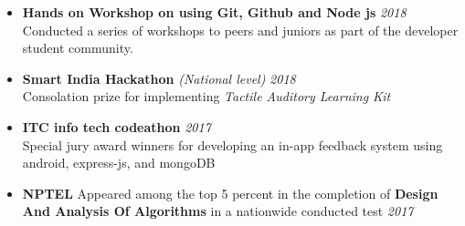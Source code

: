 \documentclass[11pt,a4paper]{article}
\begin{document}
{
\colorbox{gray}{}
\begin{itemize}
    \item \textbf{Hands on Workshop on using  Git, Github and Node js} \hfill \textit{2018}
    \\Conducted a series of workshops to peers and juniors as part of the developer student community.
\end{itemize}
}
{
\colorbox{gray}{}
\begin{itemize}
    \item \textbf{Smart India Hackathon} \textit{(National level)} \hfill \textit{2018}
    \\Consolation prize for implementing \emph{Tactile Auditory Learning Kit} 
    \item \textbf{ITC info tech codeathon} \hfill \textit{2017}
    \\ Special jury award winners for developing an in-app feedback system using android, express-js, and mongoDB
    \item \textbf{NPTEL} Appeared among the top 5 percent in the completion of \textbf{Design And Analysis Of Algorithms} in a nationwide conducted test \hfill \textit{2017}
\end{itemize}
}
  
\end{document}

